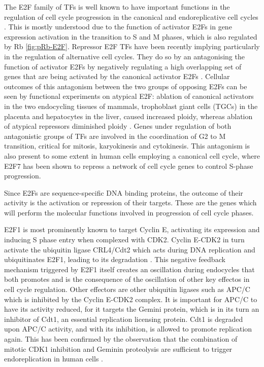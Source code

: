 \documentclass[11pt,twoside,a4paper]{report}
\begin{document}
				The E2F family of TFs is well known to have important functions in the regulation of cell cycle progression in the canonical and endoreplicative cell cycles \cite{Moon2008}\cite{Li2008}\cite{Chen2012}. This is mostly understood due to the function of activator E2Fs in gene expression activation in the transition to S and M phases, which is also regulated by Rb \ref{fig:pRb-E2F}. Repressor E2F TFs have been recently implying particularly in the regulation of alternative cell cycles. They do so by an antagonising the function of activator E2Fs by negatively regulating a high overlapping set of genes that are being activated by the canonical activator E2Fs \cite{Li2008}. Cellular outcomes of this antagonism between the two groups of opposing E2Fs can be seen by functional experiments on atypical E2F: ablation of canonical activators in the two endocycling tissues of mammals, trophoblast giant cells (TGCs) in the placenta and hepatocytes in the liver, caused increased ploidy, whereas ablation of atypical repressors diminished ploidy \cite{Chen2012}. Genes under regulation of both antagonistic groups of TFs are involved in the coordination of G2 to M transition, critical for mitosis, karyokinesis and cytokinesis. This antagonism is also present to some extent in human cells employing a canonical cell cycle, where E2F7 has been shown to repress a network of cell cycle genes to control S-phase progression.\cite{Westendorp2012}
				
				Since E2Fs are sequence-specific DNA binding proteins, the outcome of their activity is the activation or repression of their targets. These are the genes which will perform the molecular functions involved in progression of cell cycle phases.
				
				E2F1 is most prominently known to target Cyclin E, activating its expression and inducing S phase entry when complexed with CDK2. Cyclin E-CDK2 in turn activate the ubiquitin ligase CRL4/Cdt2 which acts during DNA replication and ubiquitinates E2F1, leading to its degradation \cite{Zielke2011}\cite{Havens2011}\cite{Shibutani2008}. This negative feedback mechanism triggered by E2F1 itself creates an oscillation during endocycles that both promotes and is the consequence of the oscillation of other key effectos in cell cycle regulation. Other effectors are other ubiquitin ligases such as APC/C which is inhibited by the Cyclin E-CDK2 complex. It is important for APC/C to have its activity reduced, for it targets the Gemini protein, which is in its turn an inhibitor of Cdt1, an essential replication licensing protein. Cdt1 is degraded upon APC/C activity, and with its inhibition, is allowed to promote replication again. This has been confirmed by the observation that the combination of mitotic CDK1 inhibition and Geminin proteolysis are sufficient to trigger endoreplication in human cells \cite{Hochegger2007}.
				
\end{document}
